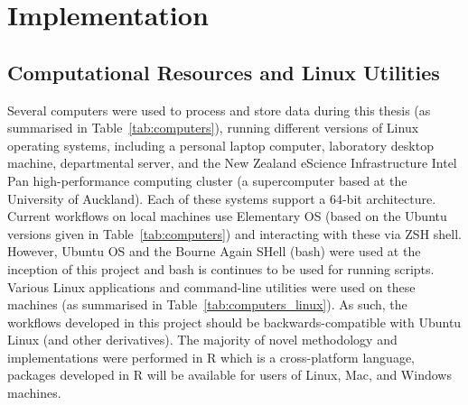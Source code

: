 \section{Implementation}



\subsection{Computational Resources and Linux Utilities}

Several computers were used to process and store data during this thesis (as summarised in Table~\ref{tab:computers}), running different versions of Linux operating systems, including a personal laptop computer, laboratory desktop machine, departmental server, and the New Zealand eScience Infrastructure Intel Pan high-performance computing cluster (a supercomputer based at the University of Auckland). Each of these systems support a 64-bit architecture. Current workflows on local machines use Elementary OS (based on the Ubuntu versions given in Table~\ref{tab:computers}) and interacting with these via ZSH shell. However, Ubuntu OS and the Bourne Again SHell (bash) were used at the inception of this project and bash is continues to be used for running scripts. Various Linux applications and command-line utilities were used on these machines (as summarised in Table~\ref{tab:computers_linux}). As such, the workflows developed in this project should be backwards-compatible with Ubuntu Linux (and other derivatives). The majority of novel methodology and implementations were performed in R which is a cross-platform language, packages developed in R will be available for users of Linux, Mac, and Windows machines.  


